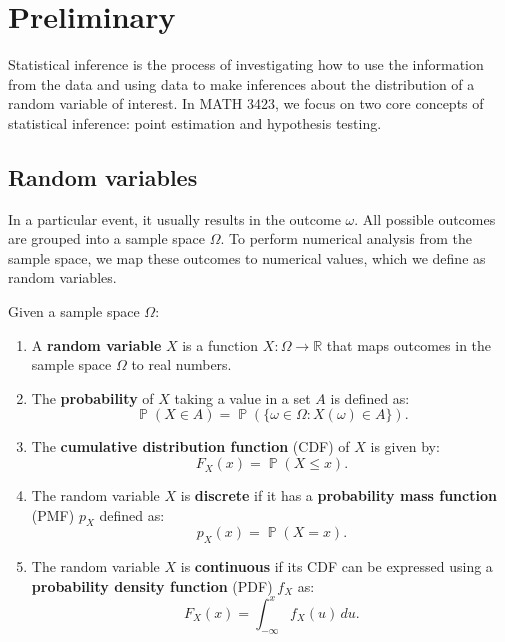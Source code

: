 \documentclass{huhtakm-template-book-v2}
\DeclareMathOperator{\prob}{\mathbb{P}}
\begin{document}
\chapter{Preliminary}
    Statistical inference is the process of investigating how to use the information from the data and using data to make inferences about the distribution of a random variable of interest. In MATH 3423, we focus on two core concepts of statistical inference: point estimation and hypothesis testing.

\section{Random variables}
    In a particular event, it usually results in the outcome $\omega$. All possible outcomes are grouped into a sample space $\Omega$. To perform numerical analysis from the sample space, we map these outcomes to numerical values, which we define as random variables.
    \begin{defn}
        Given a sample space $\Omega$:
        \begin{enumerate}
            \item A \textbf{random variable} $X$ is a function $X:\Omega\to\mathbb{R}$ that maps outcomes in the sample space $\Omega$ to real numbers.
            \item The \textbf{probability} of $X$ taking a value in a set $A$ is defined as:
            \begin{equation*}
                \prob(X \in A) = \prob(\{\omega \in \Omega : X(\omega) \in A\}).
            \end{equation*}
            \item The \textbf{cumulative distribution function} (CDF) of $X$ is given by:
            \begin{equation*}
                F_{X}(x) = \prob(X \leq x).
            \end{equation*}
            \item The random variable $X$ is \textbf{discrete} if it has a \textbf{probability mass function} (PMF) $p_{X}$ defined as:
            \begin{equation*}
                p_{X}(x) = \prob(X = x).
            \end{equation*}
            \item The random variable $X$ is \textbf{continuous} if its CDF can be expressed using a \textbf{probability density function} (PDF) $f_{X}$ as:
            \begin{equation*}
                F_{X}(x) = \int_{-\infty}^{x} f_{X}(u) \, du.
            \end{equation*}
        \end{enumerate}
    \end{defn}
\end{document}
